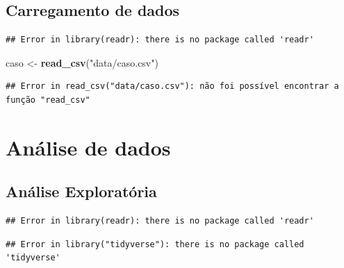 \documentclass[
]{book}
\newenvironment{Shaded}{\begin{snugshade}}{\end{snugshade}}
\newcommand{\CommentTok}[1]{\textcolor[rgb]{0.56,0.35,0.01}{\textit{#1}}}
\newcommand{\KeywordTok}[1]{\textcolor[rgb]{0.13,0.29,0.53}{\textbf{#1}}}
\newcommand{\NormalTok}[1]{#1}
\newcommand{\StringTok}[1]{\textcolor[rgb]{0.31,0.60,0.02}{#1}}
\begin{document}
\hypertarget{carregamento-de-dados}{%
\subsection{Carregamento de dados}\label{carregamento-de-dados}}

\begin{Shaded}
\end{Shaded}

\begin{verbatim}
## Error in library(readr): there is no package called 'readr'
\end{verbatim}

\begin{Shaded}
\begin{Highlighting}[]
\NormalTok{caso <-}\StringTok{ }\KeywordTok{read_csv}\NormalTok{(}\StringTok{"data/caso.csv"}\NormalTok{)}
\end{Highlighting}
\end{Shaded}

\begin{verbatim}
## Error in read_csv("data/caso.csv"): não foi possível encontrar a função "read_csv"
\end{verbatim}

\hypertarget{anuxe1lise-de-dados}{%
\section{Análise de dados}\label{anuxe1lise-de-dados}}

\hypertarget{anuxe1lise-exploratuxf3ria}{%
\subsection{Análise Exploratória}\label{anuxe1lise-exploratuxf3ria}}

\begin{verbatim}
## Error in library(readr): there is no package called 'readr'
\end{verbatim}

\begin{verbatim}
## Error in library("tidyverse"): there is no package called 'tidyverse'
\end{verbatim}
\end{document}
